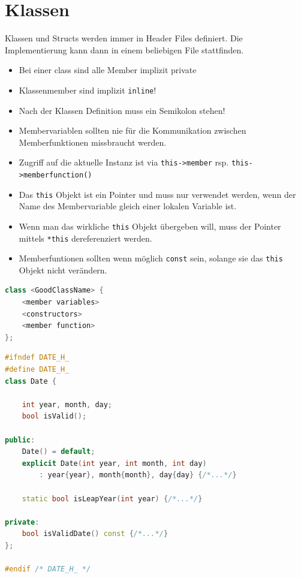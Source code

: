 \section{Klassen}
Klassen und Structs werden immer in Header Files definiert. Die Implementierung kann dann in einem beliebigen File stattfinden.
\begin{itemize}
	\item Bei einer class sind alle Member implizit private
	\item Klassenmember sind implizit \lstinline|inline|!
	\item Nach der Klassen Definition muss ein Semikolon stehen!
	\item Membervariablen sollten nie für die Kommunikation zwischen Memberfunktionen missbraucht werden.
	\item Zugriff auf die aktuelle Instanz ist via \lstinline|this->member| rsp. \lstinline|this->memberfunction()|
	\item Das \lstinline|this| Objekt ist ein Pointer und muss nur verwendet werden, wenn der Name des Membervariable gleich einer lokalen Variable ist.
	\item Wenn man das wirkliche \lstinline|this| Objekt übergeben will, muss der Pointer mittels \lstinline|*this| dereferenziert werden.
	\item Memberfuntionen sollten wenn möglich \lstinline|const| sein, solange sie das \lstinline|this| Objekt nicht verändern.
\end{itemize}

\begin{lstlisting}[language=C++, caption=A good Class]
class <GoodClassName> {
	<member variables>
	<constructors>
	<member function>	 							
};	
\end{lstlisting}


\begin{lstlisting}[language=C++, caption=Klassentyp im Header File]
#ifndef DATE_H_
#define DATE_H_
class Date {

	int year, month, day;
	bool isValid();
	
public:
	Date() = default;
	explicit Date(int year, int month, int day)
		: year{year}, month{month}, day{day} {/*...*/}
	
	static bool isLeapYear(int year) {/*...*/}

private:
	bool isValidDate() const {/*...*/}
};

#endif /* DATE_H_ */
\end{lstlisting}

